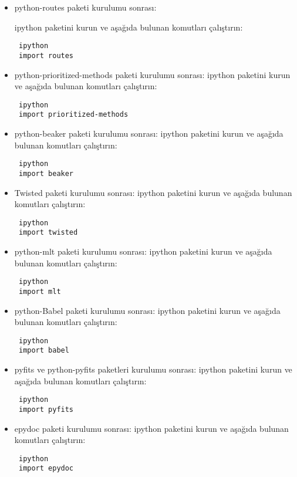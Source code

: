 \documentclass[a4paper,10pt]{article}
\begin{document}
\begin{itemize}
\item python-routes paketi kurulumu sonrası:

ipython paketini kurun ve aşağıda bulunan komutları çalıştırın:
\begin{verbatim}
 ipython
 import routes
\end{verbatim}


\item python-prioritized-methods paketi kurulumu sonrası:
ipython paketini kurun ve aşağıda bulunan komutları çalıştırın:
\begin{verbatim}
 ipython
 import prioritized-methods
\end{verbatim}


\item python-beaker paketi kurulumu sonrası:
ipython paketini kurun ve aşağıda bulunan komutları çalıştırın:
\begin{verbatim}
 ipython
 import beaker
\end{verbatim}

\item Twisted paketi kurulumu sonrası:
ipython paketini kurun ve aşağıda bulunan komutları çalıştırın:
\begin{verbatim}
 ipython
 import twisted
\end{verbatim}

\item python-mlt paketi kurulumu sonrası:
ipython paketini kurun ve aşağıda bulunan komutları çalıştırın:
\begin{verbatim}
 ipython
 import mlt
\end{verbatim}


\item python-Babel paketi kurulumu sonrası:
ipython paketini kurun ve aşağıda bulunan komutları çalıştırın:
\begin{verbatim}
 ipython
 import babel
\end{verbatim}

\item pyfits ve python-pyfits  paketleri kurulumu sonrası:
ipython paketini kurun ve aşağıda bulunan komutları çalıştırın:
\begin{verbatim}
 ipython
 import pyfits
\end{verbatim}


\item epydoc paketi kurulumu sonrası:
ipython paketini kurun ve aşağıda bulunan komutları çalıştırın:
\begin{verbatim}
 ipython
 import epydoc
\end{verbatim}


\end{itemize}
\end{document}
